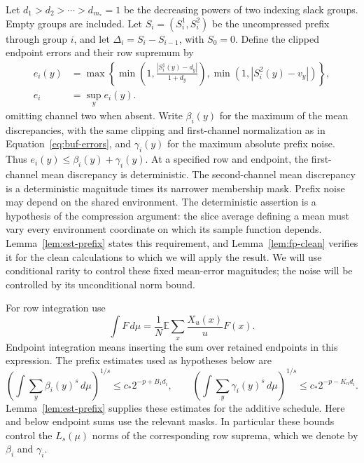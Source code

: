 Let $d_1>d_2>\cdots>d_{m_*}=1$ be the decreasing powers of two indexing
slack groups.  Empty groups are included.  Let $S_i=(S_i^1,S_i^2)$ be the
uncompressed prefix through group $i$, and let
$\Delta_i=S_i-S_{i-1}$, with $S_0=0$.  Define the clipped endpoint errors
and their row supremum by
\begin{equation}
 \begin{aligned}
 e_i(y)&=\max\left\{
 \min\left(1,\frac{|S_i^1(y)-d_y|}{1+d_y}\right),
 \min(1,|S_i^2(y)-v_y|)\right\},\\
 e_i&=\sup_y e_i(y).
 \end{aligned}
 \label{eq:buf-errors}
\end{equation}
omitting channel two when absent.  Write $\beta_i(y)$ for the maximum of
the mean discrepancies, with the same clipping and first-channel
normalization as in Equation~\eqref{eq:buf-errors}, and $\gamma_i(y)$ for
the maximum absolute prefix noise.  Thus
$e_i(y)\leq\beta_i(y)+\gamma_i(y)$.  At a specified row and endpoint, the
first-channel mean discrepancy is deterministic.  The second-channel mean
discrepancy is a deterministic magnitude times its narrower membership
mask.  Prefix noise may depend on the shared environment.
The deterministic assertion is a hypothesis of the compression argument:
the slice average defining a mean must vary every environment coordinate
on which its sample function depends.  Lemma~\ref{lem:est-prefix} states
this requirement, and Lemma~\ref{lem:fp-clean} verifies it for the clean
calculations to which we will apply the result.  We will use conditional
rarity to control these fixed mean-error magnitudes; the noise will be
controlled by its unconditional norm bound.

For row integration use
\[
 \int F\,d\mu=\frac1N\mathbb E\sum_x\frac{X_u(x)}u F(x).
\]
Endpoint integration means inserting the sum over retained endpoints in
this expression.  The prefix estimates used as hypotheses below are
\begin{equation}
 \left(\int\sum_y\beta_i(y)^s\,d\mu\right)^{1/s}
       \leq c_*2^{-p+B_1d_i},\qquad
 \left(\int\sum_y\gamma_i(y)^s\,d\mu\right)^{1/s}
       \leq c_*2^{-p-K_nd_i}.
 \label{eq:buf-prefix-interface}
\end{equation}
Lemma~\ref{lem:est-prefix} supplies these estimates for the additive
schedule.  Here and below endpoint sums use the relevant masks.  In
particular these bounds control the $L_s(\mu)$ norms of the corresponding
row suprema, which we denote by $\beta_i$ and $\gamma_i$.

